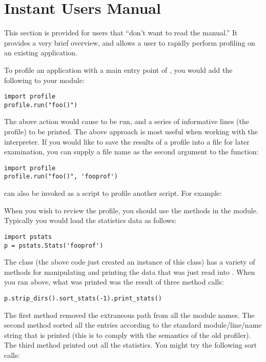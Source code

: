\section{Instant Users Manual}

This section is provided for users that ``don't want to read the
manual.'' It provides a very brief overview, and allows a user to
rapidly perform profiling on an existing application.

To profile an application with a main entry point of , you
would add the following to your module:

\bcode\begin{verbatim}
import profile
profile.run("foo()")
\end{verbatim}\ecode
%
The above action would cause  to be run, and a series of
informative lines (the profile) to be printed.  The above approach is
most useful when working with the interpreter.  If you would like to
save the results of a profile into a file for later examination, you
can supply a file name as the second argument to the 
function:

\bcode\begin{verbatim}
import profile
profile.run("foo()", 'fooprof')
\end{verbatim}\ecode
%
 can also be invoked as
a script to profile another script.  For example:

When you wish to review the profile, you should use the methods in the
 module.  Typically you would load the statistics data as
follows:

\bcode\begin{verbatim}
import pstats
p = pstats.Stats('fooprof')
\end{verbatim}\ecode
%
The class  (the above code just created an instance of
this class) has a variety of methods for manipulating and printing the
data that was just read into .  When you ran
 above, what was printed was the result of three
method calls:

\bcode\begin{verbatim}
p.strip_dirs().sort_stats(-1).print_stats()
\end{verbatim}\ecode
%
The first method removed the extraneous path from all the module
names. The second method sorted all the entries according to the
standard module/line/name string that is printed (this is to comply
with the semantics of the old profiler).  The third method printed out
all the statistics.  You might try the following sort calls:

